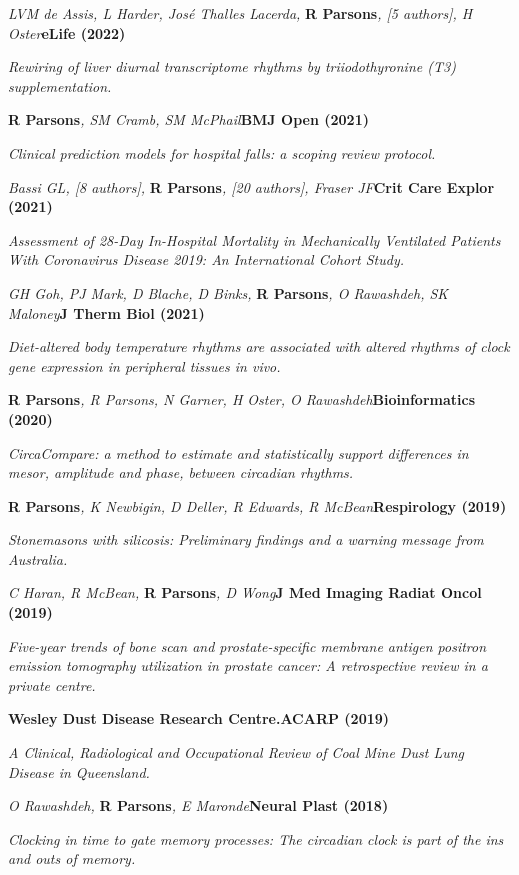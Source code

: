 \item
	\textit{LVM de Assis, L Harder, José Thalles Lacerda, }\textbf{R Parsons}\textit{, [5 authors], H Oster}\textbf{\hfill eLife (2022)}\par 
    \textit{Rewiring of liver diurnal transcriptome rhythms by triiodothyronine (T3) supplementation.}
\item
    \textbf{R Parsons}\textit{, SM Cramb, SM McPhail}\textbf{\hfill BMJ Open (2021)}\par 
    \textit{Clinical prediction models for hospital falls: a scoping review protocol.}
\item
    \textit{Bassi GL, [8 authors], }\textbf{R Parsons}\textit{, [20 authors], Fraser JF}\textbf{\hfill Crit Care Explor (2021)}\par 
    \textit{Assessment of 28-Day In-Hospital Mortality in Mechanically Ventilated Patients With Coronavirus Disease 2019: An International Cohort Study.}
\item
    \textit{GH Goh, PJ Mark, D Blache, D Binks, }\textbf{R Parsons}\textit{, O Rawashdeh, SK Maloney}\textbf{\hfill J Therm Biol (2021)}\par 
    \textit{Diet-altered body temperature rhythms are associated with altered rhythms of clock gene expression in peripheral tissues in vivo.}
\item
    \textbf{R Parsons}\textit{, R Parsons, N Garner, H Oster, O Rawashdeh}\textbf{\hfill Bioinformatics (2020)}\par 
    \textit{CircaCompare: a method to estimate and statistically support differences in mesor, amplitude and phase, between circadian rhythms.}
\item
    \textbf{R Parsons}\textit{, K Newbigin, D Deller, R Edwards, R McBean}\textbf{\hfill Respirology (2019)}\par 
    \textit{Stonemasons with silicosis: Preliminary findings and a warning message from Australia.}
\item
    \textit{C Haran, R McBean, }\textbf{R Parsons}\textit{, D Wong}\textbf{\hfill J Med Imaging Radiat Oncol (2019)}\par 
    \textit{Five-year trends of bone scan and prostate-specific membrane antigen positron emission tomography utilization in prostate cancer: A retrospective review in a private centre.}
\item
    \textbf{Wesley Dust Disease Research Centre.}\textbf{\hfill ACARP (2019)}\par 
    \textit{A Clinical, Radiological and Occupational Review of Coal Mine Dust Lung Disease in Queensland.}
\item
    \textit{O Rawashdeh, }\textbf{R Parsons}\textit{, E Maronde}\textbf{\hfill Neural Plast (2018)}\par 
    \textit{Clocking in time to gate memory processes: The circadian clock is part of the ins and outs of memory.}
